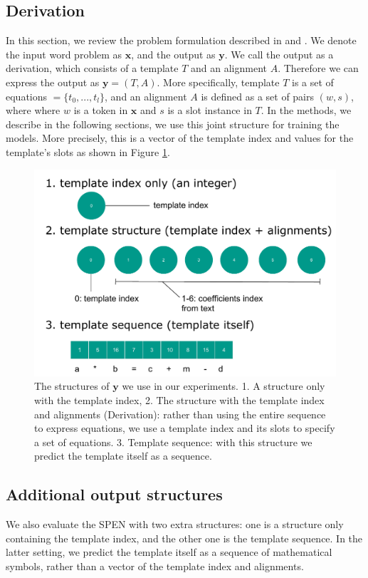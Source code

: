 \documentclass[11pt,letterpaper]{article}
\begin{document}
\subsection{Derivation}
In this section, we review the problem formulation described in \cite{Kushman2014LearningTA} and \cite{UpChChYi16}. We denote the input word problem as $\textbf{x}$, and the output as $\textbf{y}$. We call the output as a derivation, which consists of a template $T$ and an alignment $A$. Therefore we can express the output as $\textbf{y} = (T, A)$. More specifically, template $T$ is a set of equations $= \{t_0, ..., t_l\}$, and an alignment $A$ is defined as a set of pairs $(w, s)$, where where $w$ is a token in $\textbf{x}$ and $s$ is a slot instance in $T$. In the methods, we describe in the following sections, we use this joint structure for training the models. More precisely, this is a vector of the template index and values for the template's slots as shown in Figure \ref{derivation}.
\begin{figure}[ht]
	\centering
	\includegraphics[bb=0 0 502 344, scale=0.5]{figs/structures.pdf}
    \caption{The structures of $\mathbf{y}$ we use in our experiments. 1. A structure only with the template index, 2. The structure with the template index and alignments (Derivation): rather than using the entire sequence to express equations, we use a template index and its slots to specify a set of equations. 3. Template sequence: with this structure we predict the template itself as a sequence.}
    \label{derivation}
\end{figure}
\subsection{Additional output structures}
We also evaluate the SPEN with two extra structures: one is a structure only containing the template index, and the other one is the template sequence. In the latter setting, we predict the template itself as a sequence of mathematical symbols, rather than a vector of the template index and alignments.
\end{document}
